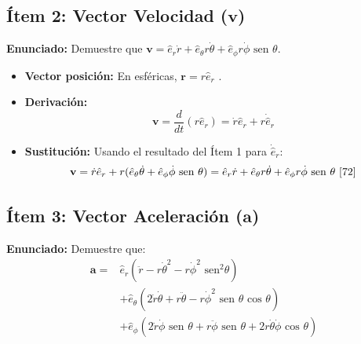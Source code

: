 \documentclass[a4paper]{article}
\begin{document}
\subsection*{Ítem 2: Vector Velocidad ($\mathbf{v}$)}
\textbf{Enunciado:} Demuestre que $\mathbf{v} = \hat{e}_r \dot{r} + \hat{e}_\theta r\dot{\theta} + \hat{e}_\phi r\dot{\phi} \text{ sen } \theta$.

\begin{itemize}
    \item \textbf{Vector posición:} En esféricas, $\mathbf{r} = r \hat{e}_r$ \cite{47}.
    \item \textbf{Derivación:} 
    \begin{equation*}
        \mathbf{v} = \frac{d}{dt}(r \hat{e}_r) = \dot{r} \hat{e}_r + r \dot{\hat{e}}_r
    \end{equation*}
    \item \textbf{Sustitución:} Usando el resultado del Ítem 1 para $\dot{\hat{e}}_r$:
    \begin{equation*}
        \mathbf{v} = \dot{r} \hat{e}_r + r (\hat{e}_\theta \dot{\theta} + \hat{e}_\phi \dot{\phi} \text{ sen } \theta) = \hat{e}_r \dot{r} + \hat{e}_\theta r\dot{\theta} + \hat{e}_\phi r\dot{\phi} \text{ sen } \theta \text{ \cite{72}}
    \end{equation*}
\end{itemize}

\subsection*{Ítem 3: Vector Aceleración ($\mathbf{a}$)}
\textbf{Enunciado:} Demuestre que:
\begin{align*}
    \mathbf{a} = &\hat{e}_r(\ddot{r} - r\dot{\theta}^2 - r\dot{\phi}^2 \text{ sen}^2 \theta) \\
    &+ \hat{e}_\theta(2\dot{r}\dot{\theta} + r\ddot{\theta} - r\dot{\phi}^2 \text{ sen } \theta \text{ cos } \theta) \\
    &+ \hat{e}_\phi(2\dot{r}\dot{\phi} \text{ sen } \theta + r\ddot{\phi} \text{ sen } \theta + 2r\dot{\theta}\dot{\phi} \text{ cos } \theta)
\end{align*}
\end{document}
